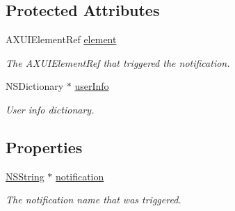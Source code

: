 \subsection*{Protected Attributes}
\begin{DoxyCompactItemize}
\item 
\hypertarget{interface_g_d_accessibility_notification_a8b20d367e858a860e134618752493f0c}{
AXUIElementRef \hyperlink{interface_g_d_accessibility_notification_a8b20d367e858a860e134618752493f0c}{element}}
\label{interface_g_d_accessibility_notification_a8b20d367e858a860e134618752493f0c}

\begin{DoxyCompactList}\small\item\em The AXUIElementRef that triggered the notification. \item\end{DoxyCompactList}\item 
\hypertarget{interface_g_d_accessibility_notification_a0fd79497e2441128299e3f1f98324451}{
NSDictionary $\ast$ \hyperlink{interface_g_d_accessibility_notification_a0fd79497e2441128299e3f1f98324451}{userInfo}}
\label{interface_g_d_accessibility_notification_a0fd79497e2441128299e3f1f98324451}

\begin{DoxyCompactList}\small\item\em User info dictionary. \item\end{DoxyCompactList}\end{DoxyCompactItemize}
\subsection*{Properties}
\begin{DoxyCompactItemize}
\item 
\hypertarget{interface_g_d_accessibility_notification_a3a35ac62a068bf9ea55170e1abc55bc9}{
\hyperlink{class_n_s_string}{NSString} $\ast$ \hyperlink{interface_g_d_accessibility_notification_a3a35ac62a068bf9ea55170e1abc55bc9}{notification}}
\label{interface_g_d_accessibility_notification_a3a35ac62a068bf9ea55170e1abc55bc9}

\begin{DoxyCompactList}\small\item\em The notification name that was triggered. \item\end{DoxyCompactList}\end{DoxyCompactItemize}


